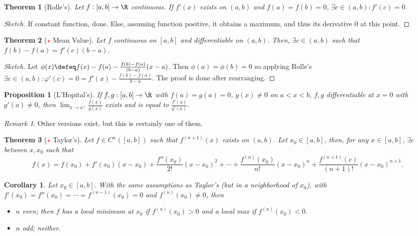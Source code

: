 \documentclass[12pt, oneside]{article}
\theoremstyle{definition}
\theoremstyle{plain}
\newtheorem{thm}{Theorem}
\newtheorem{cor}{Corollary}
\newtheorem{prop}{Proposition}
\theoremstyle{remark}
\newtheorem{remark}{Remark}
\begin{document}
\begin{thm}[Rolle's]
  Let $f : [a, b] \to \R$ continuous. If $f'(x)$ exists on $(a, b)$ and $f(a) = f(b) = 0$, $\exists c \in (a, b) : f'(c) = 0$.
\end{thm}
  
\begin{proof}[Sketch]
  If constant function, done. Else, assuming function positive, it obtains a maximum, and thus its derivative 0 at this point.
\end{proof}

\begin{thm}[\textcolor{red}{$\star$} Mean Value]
  Let $f$ continuous on $[a, b]$ and differentiable on $(a, b)$. Then, $\exists c \in (a, b)$ such that $f(b) - f(a) = f'(c) (b - a)$.
\end{thm}
\begin{proof}[Sketch]
  Let $\phi(x) \defeq f(x) - f(a) - \frac{f(b) - f(a)}{(b-a)}(x-a)$. Then $\phi(a) = \phi(b) = 0$ so applying Rolle's $\exists c \in (a, b) : \varphi'(c) = 0 = f'(x) - \frac{f(b) - f(a)}{b-a}$. The proof is done after rearranging.
\end{proof}

\begin{prop}[L'Hopital's]
  If $f, g : [a, b] \to \R$ with $f(a) = g(a) = 0$, $g(x)\neq 0$ on $a < x < b$, $f, g$ differentiable at $x = 0$ with $g'(a) \neq 0$, then $\lim_{x \to a^+} \frac{f(x)}{g(x)}$ exists and is equal to $\frac{f'(a)}{g'(a)}$.
\end{prop}
\begin{remark}
  Other versions exist, but this is certainly one of them.
\end{remark}

\begin{thm}[\textcolor{red}{$\star$} Taylor's]
  Let $f \in C^{n}([a, b])$ such that $f^{(n+1)}(x)$ exists on $(a, b)$. Let $x_0 \in [a, b]$, then, for any $x \in [a, b]$, $\exists c $ between $x, x_0$ such that \[
  f(x) = f(x_0) + f'(x_0)(x - x_0) + \frac{f''(x_0)}{2!}(x-x_0)^2 + \cdots + \frac{f^{(n)}(x_0)}{n!}(x-x_0)^n + \frac{f^{(n+1)}(c)}{(n+1)!}(x-x_0)^{n+1}.
  \]
\end{thm}

\begin{cor}
  Let $x_0 \in [a, b]$. With the same assumptions as Taylor's (but in a neighborhood of $x_0$), with $f'(x_0) = f''(x_0) = \cdots = f^{(n-1)}(x_0) = 0$ and $f^{(n)}(x_0) \neq 0$, then \begin{itemize}
    \item $n$ even; then $f$ has a local minimum at $x_0$ if $f^{(n)}(x_0) > 0$ and a local max if $f^{(n)}(x_0) < 0$.
    \item $n$ odd; neither. 
  \end{itemize}
\end{cor}
\end{document}
